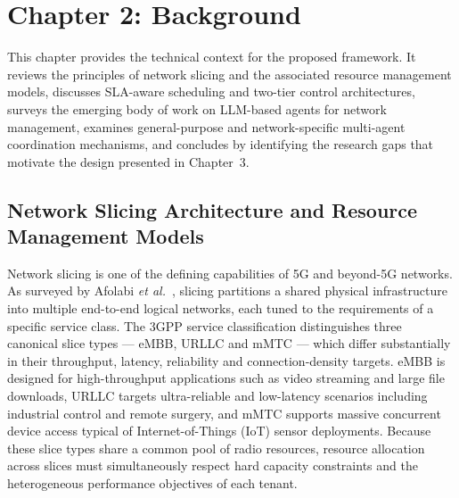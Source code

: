\section*{Chapter 2: Background}
\setcounter{section}{2} \setcounter{subsection}{0}
 {}

This chapter provides the technical context for the proposed framework. It reviews the principles of network slicing and the associated resource management models, discusses SLA-aware scheduling and two-tier control architectures, surveys the emerging body of work on LLM-based agents for network management, examines general-purpose and network-specific multi-agent coordination mechanisms, and concludes by identifying the research gaps that motivate the design presented in Chapter~3.

\subsection{Network Slicing Architecture and Resource Management Models}

Network slicing is one of the defining capabilities of 5G and beyond-5G networks. As surveyed by Afolabi \emph{et al.}~\cite{afolabi2018slicing}, slicing partitions a shared physical infrastructure into multiple end-to-end logical networks, each tuned to the requirements of a specific service class. The 3GPP service classification distinguishes three canonical slice types --- eMBB, URLLC and mMTC --- which differ substantially in their throughput, latency, reliability and connection-density targets. eMBB is designed for high-throughput applications such as video streaming and large file downloads, URLLC targets ultra-reliable and low-latency scenarios including industrial control and remote surgery, and mMTC supports massive concurrent device access typical of Internet-of-Things (IoT) sensor deployments. Because these slice types share a common pool of radio resources, resource allocation across slices must simultaneously respect hard capacity constraints and the heterogeneous performance objectives of each tenant.

